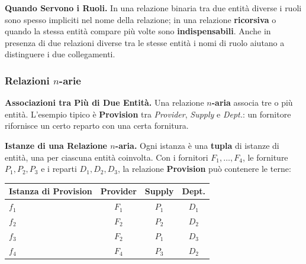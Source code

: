 \documentclass[12pt]{extarticle}
\begin{document}
\medskip
\noindent \textbf{Quando Servono i Ruoli.} In una relazione binaria tra due entità diverse i ruoli sono spesso impliciti nel nome della relazione; in una relazione \textbf{ricorsiva} o quando la stessa entità compare più volte sono \textbf{indispensabili}. Anche in presenza di due relazioni diverse tra le stesse entità i nomi di ruolo aiutano a distinguere i due collegamenti.

\subsubsection{Relazioni $n$-arie}

\noindent \textbf{Associazioni tra Più di Due Entità.} Una relazione \textbf{$n$-aria} associa tre o più entità. L'esempio tipico è \textbf{Provision} tra \textit{Provider}, \textit{Supply} e \textit{Dept.}: un fornitore rifornisce un certo reparto con una certa fornitura.

\begin{center}
\end{center}

\medskip
\noindent \textbf{Istanze di una Relazione $n$-aria.} Ogni istanza è una \textbf{tupla} di istanze di entità, una per ciascuna entità coinvolta. Con i fornitori $F_1, \dots, F_4$, le forniture $P_1, P_2, P_3$ e i reparti $D_1, D_2, D_3$, la relazione \textbf{Provision} può contenere le terne:

\begin{center}
\small
\begin{tabular}{@{}lccc@{}}
    \toprule
    \textbf{Istanza di Provision} & \textbf{Provider} & \textbf{Supply} & \textbf{Dept.} \\
    \midrule
    $f_1$ & $F_1$ & $P_1$ & $D_1$ \\
    $f_2$ & $F_2$ & $P_2$ & $D_2$ \\
    $f_3$ & $F_2$ & $P_1$ & $D_3$ \\
    $f_4$ & $F_4$ & $P_3$ & $D_2$ \\
    \bottomrule
\end{tabular}
\end{center}
\end{document}
